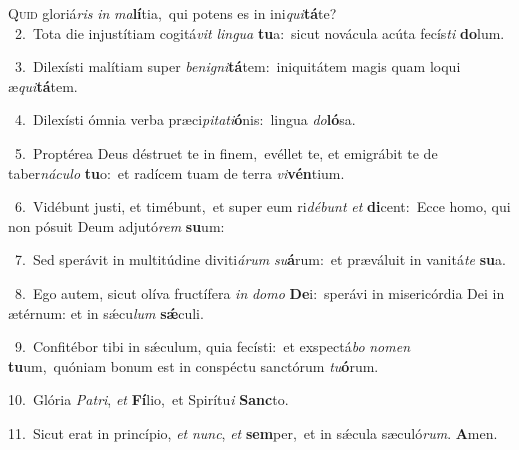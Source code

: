 \lettrine{\initial\textcolor{\initialcolor}{Q}}{uid} gloriá\textit{ris} \textit{in} \textit{ma}\-\textbf{lí}tia,~\star qui potens es in ini\-\textit{qui}\-\textbf{tá}te?\\
{\numbfont\textcolor{\numbcolor}{~2.}}~Tota die injustítiam cogitá\textit{vit} \textit{lin}\-\textit{gua} \textbf{tu}\-a:~\star sicut novácula acúta fecís\textit{ti} \textbf{do}\-lum.\par
{\numbfont\textcolor{\numbcolor}{~3.}}~Dilexísti malítiam super \textit{be}\-\textit{ni}\textit{gni}\textbf{tá}tem:~\star iniquitátem magis quam loqui æ\-\textit{qui}\-\textbf{tá}tem.\par
{\numbfont\textcolor{\numbcolor}{~4.}}~Dilexísti ómnia verba præci\-\textit{pi}\-\textit{ta}\textit{ti}\textbf{ó}nis:~\star lingua \textit{do}\-\textbf{ló}sa.\par
{\numbfont\textcolor{\numbcolor}{~5.}}~Proptérea Deus déstruet te in finem,~\dagger evéllet te, et emigrábit te de taber\-\textit{ná}\-\textit{cu}\textit{lo} \textbf{tu}\-o:~\star et radícem tuam de terra \textit{vi}\-\textbf{vén}tium.\par
{\numbfont\textcolor{\numbcolor}{~6.}}~Vidébunt justi, et timébunt,~\dagger et super eum ri\-\textit{dé}\-\textit{bunt} \textit{et} \textbf{di}\-cent:~\star Ecce homo, qui non pósuit Deum adjutó\textit{rem} \textbf{su}\-um:\par
{\numbfont\textcolor{\numbcolor}{~7.}}~Sed sperávit in multitúdine diviti\-\textit{á}\-\textit{rum} \textit{su}\-\textbf{á}rum:~\star et præváluit in vanitá\textit{te} \textbf{su}\-a.\par
{\numbfont\textcolor{\numbcolor}{~8.}}~Ego autem, sicut olíva fructífera \textit{in} \textit{do}\-\textit{mo} \textbf{De}\-i:~\star sperávi in misericórdia Dei in ætérnum: et in sǽcu\textit{lum} \textbf{sǽ}\-culi.\par
{\numbfont\textcolor{\numbcolor}{~9.}}~Confitébor tibi in sǽculum, quia fecísti:~\dagger et exspectá\textit{bo} \textit{no}\-\textit{men} \textbf{tu}\-um,~\star quóniam bonum est in conspéctu sanctórum \textit{tu}\-\textbf{ó}rum.\par
{\numbfont\textcolor{\numbcolor}{10.}}~Glória \textit{Pa}\-\textit{tri}, \textit{et} \textbf{Fí}\-lio,~\star et Spirítu\textit{i} \textbf{Sanc}\-to.\par
{\numbfont\textcolor{\numbcolor}{11.}}~Sicut erat in princípio, \textit{et} \textit{nunc}\-, \textit{et} \textbf{sem}\-per,~\star et in sǽcula sæculó\-\textit{rum}\-. \textbf{A}\-men.\par
